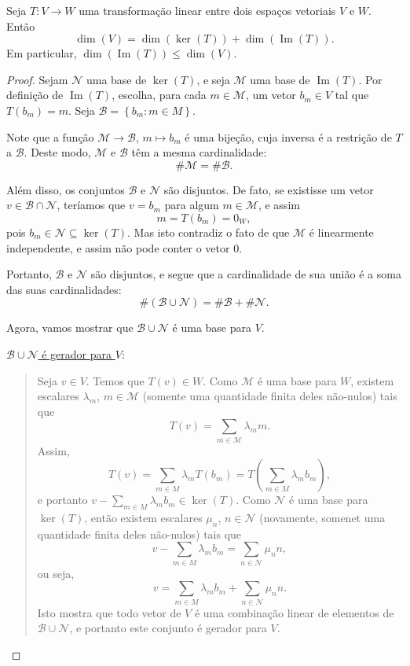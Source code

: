 \begin{theorem}
	Seja $T\colon V\to W$ uma transformação linear entre dois espaços vetoriais $V$ e $W$. Então
	\[\dim(V)=\dim(\ker(T))+\dim(\operatorname{Im}(T)).\]
	Em particular, $\dim(\operatorname{Im}(T))\leq\dim(V)$.
\end{theorem}

\begin{proof}
	Sejam $\mathcal{N}$ uma base de $\ker(T)$, e seja $\mathcal{M}$ uma base de $\operatorname{Im}(T)$. Por definição de $\operatorname{Im}(T)$, escolha, para cada $m\in\mathcal{M}$, um vetor $b_m\in V$ tal que $T(b_m)=m$. Seja $\mathcal{B}=\left\{b_m:m\in M\right\}$.
	
	Note que a função $\mathcal{M}\to\mathcal{B}$, $m\mapsto b_m$ é uma bijeção, cuja inversa é a restrição de $T$ a $\mathcal{B}$. Deste modo, $\mathcal{M}$ e $\mathcal{B}$ têm a mesma cardinalidade:
	\[\#\mathcal{M}=\#\mathcal{B}\tag{1}.\]
	
	Além disso, os conjuntos $\mathcal{B}$ e $\mathcal{N}$ são disjuntos. De fato, se existisse um vetor $v\in\mathcal{B}\cap\mathcal{N}$, teríamos que $v=b_m$ para algum $m\in \mathcal{M}$, e assim
	\[m=T(b_m)=0_W,\]
	pois $b_m\in\mathcal{N}\subseteq\ker(T)$. Mas isto contradiz o fato de que $\mathcal{M}$ é linearmente independente, e assim não pode conter o vetor $0$.
	
	Portanto, $\mathcal{B}$ e $\mathcal{N}$ são disjuntos, e segue que a cardinalidade de sua união é a soma das suas cardinalidades:
	\[\#\left(\mathcal{B}\cup\mathcal{N}\right)=\#\mathcal{B}+\#\mathcal{N}.\tag{2}\]
	
	Agora, vamos mostrar que $\mathcal{B}\cup\mathcal{N}$ é uma base para $V$.
	
	\uline{$\mathcal{B}\cup\mathcal{N}$ é gerador para $V$}:
	
	\begin{quote}
		Seja $v\in V$. Temos que $T(v)\in W$. Como $\mathcal{M}$ é uma base para $W$, existem escalares $\lambda_m$, $m\in \mathcal{M}$ (somente uma quantidade finita deles não-nulos) tais que
		\[T(v)=\sum_{m\in \mathcal{M}}\lambda_m m.\]
		Assim,
		\[T(v)=\sum_{m\in M}\lambda_m T(b_m)=T\left(\sum_{m\in M}\lambda_m b_m\right),\]
		e portanto $v-\sum_{m\in M}\lambda_m b_m\in\ker(T)$. Como $\mathcal{N}$ é uma base para $\ker(T)$, então existem escalares $\mu_n$, $n\in \mathcal{N}$ (novamente, somenet uma quantidade finita deles não-nulos) tais que
		\[v-\sum_{m\in M}\lambda_m b_m=\sum_{n\in\mathcal{N}}\mu_n n,\]
		ou seja,
		\[v=\sum_{m\in M}\lambda_m b_m+\sum_{n\in\mathcal{N}}\mu_n n.\]
		Isto mostra que todo vetor de $V$ é uma combinação linear de elementos de $\mathcal{B}\cup\mathcal{N}$, e portanto este conjunto é gerador para $V$.
	\end{quote}
	

\end{proof}
